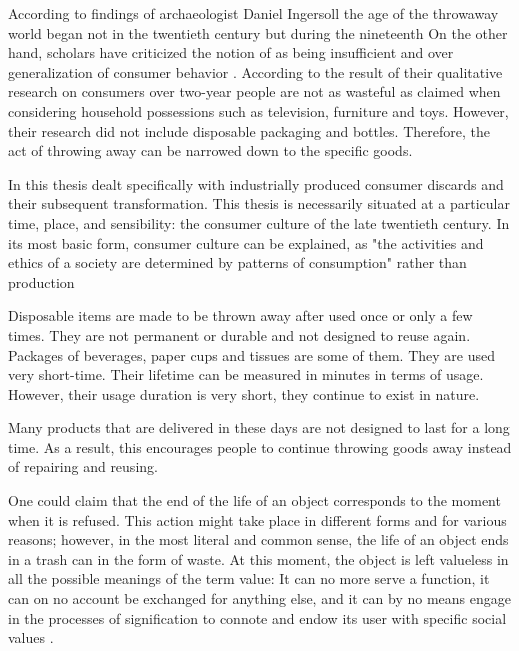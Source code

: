 According to findings of archaeologist Daniel Ingersoll the age of the throwaway world began not in the twentieth century but during the nineteenth \citep[41]{rathje1992rubbish} On the other hand, scholars have criticized the notion of  as being insufficient and over generalization of consumer behavior \citep{gregson2007identity}. According to the result of their qualitative research on consumers over two-year people are not as wasteful as claimed when considering household possessions such as television, furniture and toys. However, their research did not include disposable packaging and bottles. Therefore, the act of throwing away can be narrowed down to the specific goods.

In this thesis dealt specifically with industrially produced consumer discards and their subsequent transformation. This thesis is necessarily situated at a particular time, place, and sensibility: the consumer culture of the late twentieth century. In its most basic form, consumer culture can be explained, as "the activities and ethics of a society are determined by patterns of consumption" rather than production 










%
%
Disposable items are made to be thrown away after used once or only a few times. They are not permanent or durable and not designed to reuse again. Packages of beverages, paper cups and tissues are some of them. They are used very short-time. Their lifetime can be measured in minutes in terms of usage. However, their usage duration is very short, they continue to exist in nature.

Many products that are delivered in these days are not designed to last for a long time. As a result, this encourages people to continue throwing goods away instead of repairing and reusing. 

One could claim that the end of the life of an object corresponds to the moment when it is refused. This action might take place in different forms and for various reasons; however, in the most literal and common sense, the life of an object ends in a trash can in the form of waste. At this moment, the object is left valueless in all the possible meanings of the term value: It can no more serve a function, it can on no account be exchanged for anything else, and it can by no means engage in the processes of signification to connote and endow its user with specific social values \citep[63]{emgin2012trashion}.

